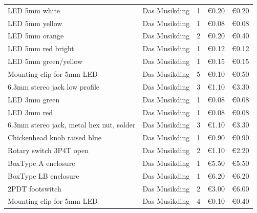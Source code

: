 \begin{longtable}{p{7cm} l r r r}
	LED 5mm white                                      & Das Musikding     & 1            & €0.20               & €0.20          \\
	LED 5mm yellow                                     & Das Musikding     & 1            & €0.08               & €0.08          \\
	LED 5mm orange                                     & Das Musikding     & 2            & €0.20               & €0.40          \\
	LED 5mm red bright                                 & Das Musikding     & 1            & €0.12               & €0.12          \\
	LED 5mm green/yellow                               & Das Musikding     & 1            & €0.15               & €0.15          \\
	Mounting clip for 5mm LED                          & Das Musikding     & 5            & €0.10               & €0.50          \\
	6.3mm stereo jack low profile                      & Das Musikding     & 3            & €1.10               & €3.30          \\
	LED 3mm green                                      & Das Musikding     & 1            & €0.08               & €0.08          \\
	LED 3mm red                                        & Das Musikding     & 1            & €0.08               & €0.08          \\
	6.3mm stereo jack, metal hex nut, solder           & Das Musikding     & 3            & €1.10               & €3.30          \\
	Chickenhead knob raised blue                       & Das Musikding     & 1            & €0.90               & €0.90          \\
	Rotary switch 3P4T open                            & Das Musikding     & 2            & €1.10               & €2.20          \\
	BoxType A enclosure                                & Das Musikding     & 1            & €5.50               & €5.50          \\
	BoxType LB enclosure                               & Das Musikding     & 1            & €6.20               & €6.20          \\
	2PDT footswitch                                    & Das Musikding     & 2            & €3.00               & €6.00          \\
	Mounting clip for 5mm LED                          & Das Musikding     & 4            & €0.10               & €0.40          \\

\end{longtable}
